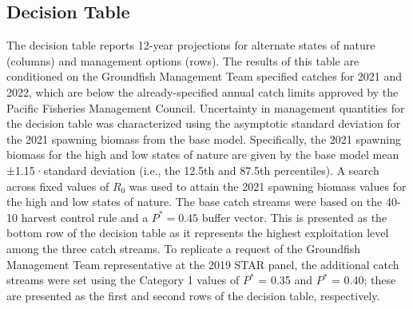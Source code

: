 \documentclass[11pt,
  english,
  a4paper,
]{article}
\begin{document}
\clearpage


\hypertarget{decision-table}{%
\subsection*{Decision Table}\label{decision-table}}

\leavevmode\tagmcend\tagstructend


The decision table reports 12-year projections for alternate states of nature (columns) and management options (rows). The results of this table are conditioned on the Groundfish Management Team specified catches for 2021 and 2022, which are below the already-specified annual catch limits approved by the Pacific Fisheries Management Council. Uncertainty in management quantities for the decision table was characterized using the asymptotic standard deviation for the 2021 spawning biomass from the base model. Specifically, the 2021 spawning biomass for the high and low states of nature are given by the base model mean ±1.15·standard deviation (i.e., the 12.5th and 87.5th percentiles). A search across fixed values of {\(R_0\)\leavevmode\tagmcend\tagstructend} was used to attain the 2021 spawning biomass values for the high and low states of nature. The base catch streams were based on the 40-10 harvest control rule and a {\(P^*= 0.45\)\leavevmode\tagmcend\tagstructend} buffer vector. This is presented as the bottom row of the decision table as it represents the highest exploitation level among the three catch streams. To replicate a request of the Groundfish Management Team representative at the 2019 STAR panel, the additional catch streams were set using the Category 1 values of {\(P^*\)\leavevmode\tagmcend\tagstructend} = 0.35 and {\(P^*\)\leavevmode\tagmcend\tagstructend} = 0.40; these are presented as the first and second rows of the decision table, respectively.

\leavevmode\tagmcend\tagstructend\par

\end{document}
